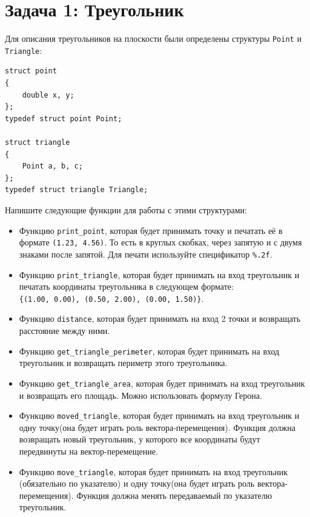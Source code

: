 \documentclass{article}
\begin{document}
\section*{Задача 1: Треугольник}
Для описания треугольников на плоскости были определены структуры \texttt{Point} и \texttt{Triangle}:
\begin{lstlisting}
struct point 
{
    double x, y;
};
typedef struct point Point;

struct triangle 
{
    Point a, b, c;
};
typedef struct triangle Triangle;
\end{lstlisting}
Напишите следующие функции для работы с этими структурами:
\begin{itemize}
\item Функцию \texttt{print\_point}, которая будет принимать точку и печатать её в формате \texttt{(1.23, 4.56)}. То есть в круглых скобках, через запятую и с двумя знаками после запятой. Для печати используйте спецификатор \texttt{\%.2f}.

\item Функцию \texttt{print\_triangle}, которая будет принимать на вход треугольник и печатать координаты треугольника в следующем формате: \\
\texttt{\{(1.00, 0.00), (0.50, 2.00), (0.00, 1.50)\}}.

\item Функцию \texttt{distance}, которая будет принимать на вход 2 точки и возвращать расстояние между ними.

\item Функцию \texttt{get\_triangle\_perimeter}, которая будет принимать на вход треугольник и возвращать периметр этого треугольника.

\item Функцию \texttt{get\_triangle\_area}, которая будет принимать на вход треугольник и возвращать его площадь. Можно использовать формулу Герона.

\item Функцию \texttt{moved\_triangle}, которая будет принимать на вход треугольник и одну точку(она будет играть роль вектора-перемещения). Функция должна возвращать новый треугольник, у которого все координаты будут передвинуты на вектор-перемещение.

\item Функцию \texttt{move\_triangle}, которая будет принимать на вход треугольник (обязательно по указателю) и одну точку(она будет играть роль вектора-перемещения). Функция должна менять передаваемый по указателю треугольник.


\end{itemize}
\end{document}
